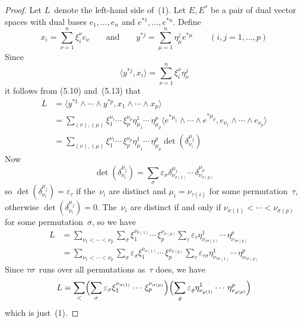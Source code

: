 \documentclass[letterpaper,12pt]{article}
\newcommand{\eprod}{\wedge}
\newcommand{\sprod}[2]{\langle#1,#2\rangle}
\newcommand{\sign}[1]{\varepsilon_{#1}}
\theoremstyle{definition}
\theoremstyle{remark}
\begin{document}
\begin{proof}
Let \(L\)~denote the left-hand side of~(1). Let \(E,E^*\) be a pair of dual vector spaces with dual bases \(e_1,\ldots,e_n\) and \(e^{*1},\ldots,e^{*n}\). Define
\[x_i=\sum_{\nu=1}^n\xi_i^{\nu}e_{\nu}\qquad\text{and}\qquad y^{*j}=\sum_{\mu=1}^n\eta^j_{\mu}e^{*\mu}\qquad(i,j=1,\ldots,p)\]
Since
\[\sprod{y^{*j}}{x_i}=\sum_{\nu=1}^n\xi_i^{\nu}\eta^j_{\nu}\]
it follows from (5.10) and~(5.13) that
\begin{align*}
L&=\sprod{y^{*1}\eprod\cdots\eprod y^{*p}}{x_1\eprod\cdots\eprod x_p}\\
	&=\sum_{(\nu),(\mu)}\xi_1^{\nu_1}\cdots\,\xi_p^{\nu_p}\eta^1_{\mu_1}\cdots\,\eta^p_{\mu_p}\sprod{e^{*\mu_1}\eprod\cdots\eprod e^{*\mu_p}}{e_{\nu_1}\eprod\cdots\eprod e_{\nu_p}}\\
	&=\sum_{(\nu),(\mu)}\xi_1^{\nu_1}\cdots\,\xi_p^{\nu_p}\eta^1_{\mu_1}\cdots\,\eta^p_{\mu_p}\det(\delta_{\nu_i}^{\mu_j})
\end{align*}
Now
\[\det(\delta_{\nu_i}^{\mu_j})=\sum_{\sigma}\sign{\sigma}\delta_{\nu_{\sigma(1)}}^{\mu_1}\cdots\,\delta_{\nu_{\sigma(p)}}^{\mu_p}\]
so \(\det(\delta_{\nu_i}^{\mu_j})=\sign{\tau}\) if the~\(\nu_i\) are distinct and \(\mu_i=\nu_{\tau(i)}\) for some permutation~\(\tau\), otherwise \(\det(\delta_{\nu_i}^{\mu_j})=0\). The~\(\nu_i\) are distinct if and only if \(\nu_{\sigma(1)}<\cdots<\nu_{\sigma(p)}\) for some permutation~\(\sigma\), so we have
\begin{align*}
L&=\sum_{\nu_1<\cdots<\nu_p}\sum_{\sigma}\xi_1^{\nu_{\sigma(1)}}\cdots\,\xi_p^{\nu_{\sigma(p)}}\sum_{\tau}\sign{\tau}\eta^1_{\nu_{\tau\sigma(1)}}\cdots\,\eta^p_{\nu_{\tau\sigma(p)}}\\
	&=\sum_{\nu_1<\cdots<\nu_p}\sum_{\sigma}\sign{\sigma}\xi_1^{\nu_{\sigma(1)}}\cdots\,\xi_p^{\nu_{\sigma(p)}}\sum_{\tau}\sign{\tau\sigma}\eta^1_{\nu_{\tau\sigma(1)}}\cdots\,\eta^p_{\nu_{\tau\sigma(p)}}
\end{align*}
Since \(\tau\sigma\)~runs over all permutations as~\(\tau\) does, we have
\[L=\sum_{<}\Bigl(\sum_{\sigma}\sign{\sigma}\xi_1^{\nu_{\sigma(1)}}\cdots\,\xi_p^{\nu_{\sigma(p)}}\Bigr)\Bigl(\sum_{\varrho}\sign{\varrho}\eta^1_{\nu_{\varrho(1)}}\cdots\,\eta^p_{\nu_{\varrho(p)}}\Bigr)\]
which is just~(1).
\end{proof}
\end{document}
